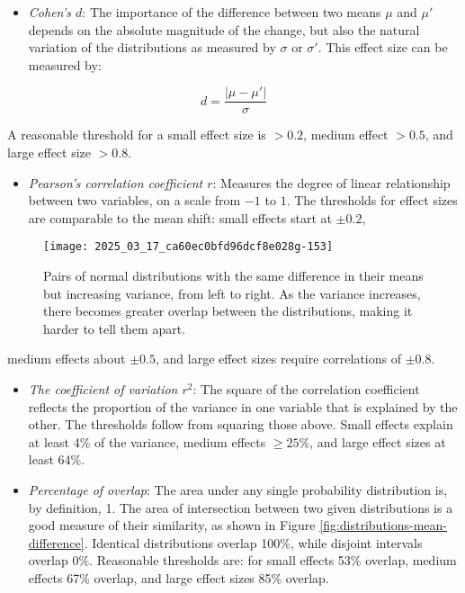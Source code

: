 \documentclass[10pt]{article}
\begin{document}
\begin{itemize}
    \item \textit{Cohen's $d$}: The importance of the difference between two means $\mu$ and $\mu'$ depends on the absolute magnitude of the change, but also the natural variation of the distributions as measured by $\sigma$ or $\sigma'$. This effect size can be measured by:
\end{itemize}

\[
    d = \frac{|\mu - \mu'|}{\sigma}
\]

A reasonable threshold for a small effect size is $>0.2$, medium effect $>0.5$, and large effect size $>0.8$.

\begin{itemize}
    \item \textit{Pearson's correlation coefficient $r$}: Measures the degree of linear relationship between two variables, on a scale from $-1$ to $1$. The thresholds for effect sizes are comparable to the mean shift: small effects start at $\pm0.2$,
\end{itemize}
\begin{figure}[h]
    \centering
    \texttt{[image: 2025\_03\_17\_ca60ec0bfd96dcf8e028g-153]}
    \caption{Pairs of normal distributions with the same difference in their means but increasing variance, from left to right. As the variance increases, there becomes greater overlap between the distributions, making it harder to tell them apart.}
    \label{fig:distributions-variance}
\end{figure}

medium effects about $\pm0.5$, and large effect sizes require correlations of $\pm0.8$.

\begin{itemize}
    \item \textit{The coefficient of variation $r^{2}$}: The square of the correlation coefficient reflects the proportion of the variance in one variable that is explained by the other. The thresholds follow from squaring those above. Small effects explain at least 4\% of the variance, medium effects $\geq 25\%$, and large effect sizes at least 64\%.
    \item \textit{Percentage of overlap}: The area under any single probability distribution is, by definition, 1. The area of intersection between two given distributions is a good measure of their similarity, as shown in Figure \ref{fig:distributions-mean-difference}. Identical distributions overlap 100\%, while disjoint intervals overlap 0\%. Reasonable thresholds are: for small effects 53\% overlap, medium effects 67\% overlap, and large effect sizes 85\% overlap.
\end{itemize}
\end{document}
